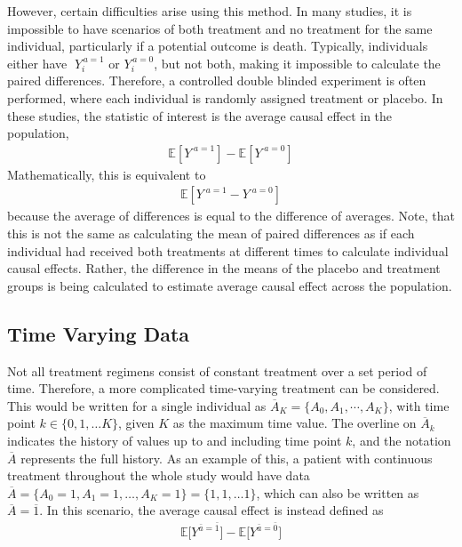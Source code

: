 However, certain difficulties arise using this method.  In many studies, it is impossible to have scenarios of both treatment and no treatment for the same individual, particularly if a potential outcome is death.  Typically, individuals either have $\; Y_i^{\, a=1}$ or  $Y_i^{\, a=0}$, but not both, making it impossible to calculate the paired differences.  Therefore, a controlled double blinded experiment is often performed, where each individual is randomly assigned treatment or placebo.  In these studies, the statistic of interest is the average causal effect in the population, 
\begin{align}  \mathbb{E}[Y^{\; a=1}] - \mathbb{E}[Y^{\; a=0}] \end{align} 
Mathematically, this is equivalent to 
\begin{align}  \mathbb{E}[Y^{\; a=1} - Y^{\; a=0}] \end{align}  
because the average of differences is equal to the difference of averages.\cite{hernan_robins_2016} Note, that this is not the same as calculating the mean of paired differences as if each individual had received both treatments at different times to calculate individual causal effects.  Rather, the difference in the means of the placebo and treatment groups is being calculated to estimate average causal effect across the population.  

\subsection{Time Varying Data} \label{Time-varying}
Not all treatment regimens consist of constant treatment over a set period of time.  Therefore, a more complicated time-varying treatment can be considered.  This would be written for a single individual as $\overline{A}_K = \{A_0, A_1, \cdots, A_K \}$, with time point $k \in \{ 0, 1, \dots K\}$, given $K$ as the maximum time value.  The overline on $\overline{A}_k$ indicates the history of values up to and including time point $k$, and the notation $\overline{A}$ represents the full history.  As an example of this, a patient with continuous treatment throughout the whole study would have data $\overline{A} = \{A_0 = 1, A_1 = 1, \dots, A_K = 1 \}  = \{1,1,\dots 1 \}$, which can also be written as $\overline{A} = \overline{1}$.  In this scenario, the average causal effect is instead defined as 
\begin{align} \mathbb{E}\bigg[Y^{\bar{a} = \bar{1}}\bigg] -  \mathbb{E}\bigg[Y^{\bar{a} = \bar{0}}\bigg] \end{align} 

